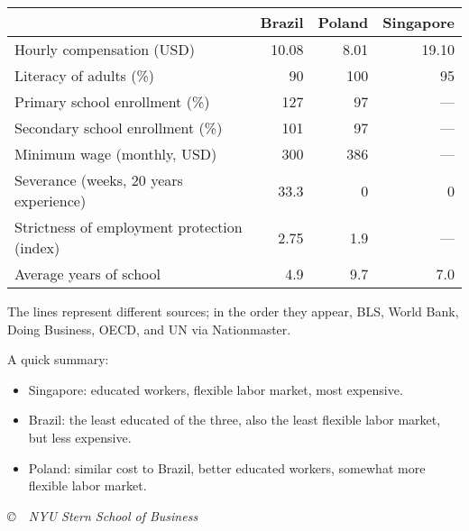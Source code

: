 \documentclass[12pt]{exam}
\begin{document}
\begin{questions}
\begin{solution}
\begin{center}
\begin{tabular}{lrrr}
\toprule
		& Brazil & Poland  & Singapore  \\
\midrule
Hourly compensation (USD)   & 10.08  & 8.01 & 19.10 \\
\midrule
Literacy of adults  (\%)    &  90 & 100 & 95 \\
Primary school enrollment (\%) & 127 & 97 & --- \\
Secondary school enrollment (\%) & 101 & 97 & --- \\
\midrule
Minimum wage (monthly, USD) & 300 & 386 & --- \\
Severance (weeks, 20 years experience)
                    & 33.3 & 0  & 0 \\
\midrule
Strictness of employment protection (index)
                & 2.75 & 1.9 & --- \\
\midrule
Average years of school  & 4.9 & 9.7 & 7.0 \\
\bottomrule
\end{tabular}
\end{center}

The lines represent different sources;
in the order they appear,
BLS, World Bank, Doing Business, OECD,
and UN via Nationmaster.

A quick summary:
\begin{itemize}
\item Singapore:  educated workers, flexible labor market, most expensive.
\item Brazil:  the least educated of the three, also the least flexible labor market,
but less expensive.
\item Poland:  similar cost to Brazil, better educated workers,
somewhat more flexible labor market.
\end{itemize}

\end{solution}


\end{questions}

\vfill \centerline{\it \copyright \ \number\year \
NYU Stern School of Business}
\end{document}
